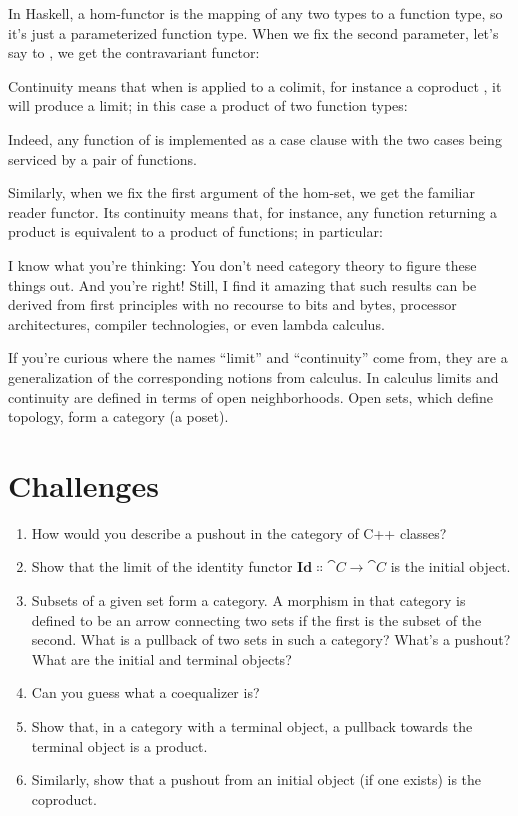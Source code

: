 In Haskell, a hom-functor is the mapping of any two types to a function
type, so it's just a parameterized function type. When we fix the second
parameter, let's say to , we get the contravariant
functor:

Continuity means that when  is applied to a colimit,
for instance a coproduct , it will produce a limit;
in this case a product of two function types:

Indeed, any function of  is implemented as a case
clause with the two cases being serviced by a pair of functions.

Similarly, when we fix the first argument of the hom-set, we get the
familiar reader functor. Its continuity means that, for instance, any
function returning a product is equivalent to a product of functions; in
particular:

I know what you're thinking: You don't need category theory to figure
these things out. And you're right! Still, I find it amazing that such
results can be derived from first principles with no recourse to bits
and bytes, processor architectures, compiler technologies, or even
lambda calculus.

If you're curious where the names ``limit'' and ``continuity'' come
from, they are a generalization of the corresponding notions from
calculus. In calculus limits and continuity are defined in terms of open
neighborhoods. Open sets, which define topology, form a category (a
poset).

\section{Challenges}

\begin{enumerate}
  \tightlist
  \item
        How would you describe a pushout in the category of C++ classes?
  \item
        Show that the limit of the identity functor
        $\mathbf{Id} \Colon \cat{C} \to \cat{C}$ is the initial object.
  \item
        Subsets of a given set form a category. A morphism in that category is
        defined to be an arrow connecting two sets if the first is the subset
        of the second. What is a pullback of two sets in such a category?
        What's a pushout? What are the initial and terminal objects?
  \item
        Can you guess what a coequalizer is?
  \item
        Show that, in a category with a terminal object, a pullback towards
        the terminal object is a product.
  \item
        Similarly, show that a pushout from an initial object (if one exists)
        is the coproduct.
\end{enumerate}
